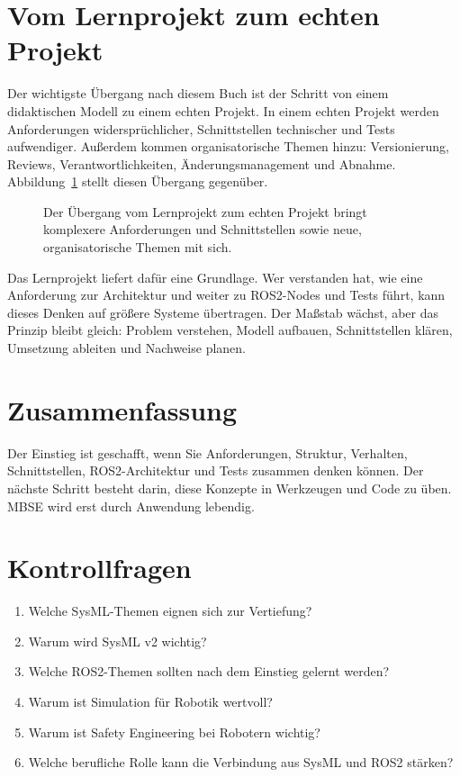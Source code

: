 \section{Vom Lernprojekt zum echten Projekt}
Der wichtigste Übergang nach diesem Buch ist der Schritt von einem didaktischen Modell zu einem echten Projekt. In einem echten Projekt werden Anforderungen widersprüchlicher, Schnittstellen technischer und Tests aufwendiger. Außerdem kommen organisatorische Themen hinzu: Versionierung, Reviews, Verantwortlichkeiten, Änderungsmanagement und Abnahme. Abbildung~\ref{fig:kap22-lernprojekt-vs-echtes-projekt} stellt diesen Übergang gegenüber.

\begin{figure}[H]
  \centering
  \caption{Der Übergang vom Lernprojekt zum echten Projekt bringt komplexere Anforderungen und Schnittstellen sowie neue, organisatorische Themen mit sich.}
  \label{fig:kap22-lernprojekt-vs-echtes-projekt}
\end{figure}

Das Lernprojekt liefert dafür eine Grundlage. Wer verstanden hat, wie eine Anforderung zur Architektur und weiter zu ROS2-Nodes und Tests führt, kann dieses Denken auf größere Systeme übertragen. Der Maßstab wächst, aber das Prinzip bleibt gleich: Problem verstehen, Modell aufbauen, Schnittstellen klären, Umsetzung ableiten und Nachweise planen.

\section{Zusammenfassung}
Der Einstieg ist geschafft, wenn Sie Anforderungen, Struktur, Verhalten, Schnittstellen, ROS2-Architektur und Tests zusammen denken können. Der nächste Schritt besteht darin, diese Konzepte in Werkzeugen und Code zu üben. MBSE wird erst durch Anwendung lebendig.

\section{Kontrollfragen}
\begin{enumerate}
    \item Welche SysML-Themen eignen sich zur Vertiefung?
    \item Warum wird SysML v2 wichtig?
    \item Welche ROS2-Themen sollten nach dem Einstieg gelernt werden?
    \item Warum ist Simulation für Robotik wertvoll?
    \item Warum ist Safety Engineering bei Robotern wichtig?
    \item Welche berufliche Rolle kann die Verbindung aus SysML und ROS2 stärken?
\end{enumerate}

